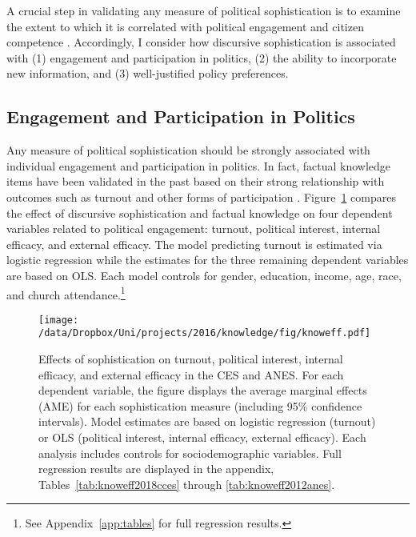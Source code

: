 A crucial step in validating any measure of political sophistication is to examine the extent to which it is correlated with political engagement and citizen competence \citep{lupia2006elitism,lupia2015uninformed}. Accordingly, I consider how discursive sophistication is associated with (1) engagement and participation in politics, (2) the ability to incorporate new information, and (3) well-justified policy preferences.


\subsection*{Engagement and Participation in Politics}
Any measure of political sophistication should be strongly associated with individual engagement and participation in politics. In fact, factual knowledge items have been validated in the past based on their strong relationship with outcomes such as turnout and other forms of participation \citep[230--233]{lupia2015uninformed}. Figure~\ref{fig:knoweff} compares the effect of discursive sophistication and factual knowledge on four dependent variables related to political engagement: turnout, political interest, internal efficacy, and external efficacy. The model predicting turnout is estimated via logistic regression while the estimates for the three remaining dependent variables are based on OLS. Each model controls for gender, education, income, age, race, and church attendance.\footnote{See Appendix~\ref{app:tables} for full regression results.}

\begin{figure}[h]\centering
\texttt{[image: /data/Dropbox/Uni/projects/2016/knowledge/fig/knoweff.pdf]}
\caption[Effects of sophistication on turnout, political interest, internal efficacy, and external efficacy]{Effects of sophistication on turnout, political interest, internal efficacy, and external efficacy in the CES and ANES. For each dependent variable, the figure displays the average marginal effects (AME) for each sophistication measure (including 95\% confidence intervals). Model estimates are based on logistic regression (turnout) or OLS (political interest, internal efficacy, external efficacy). Each analysis includes controls for sociodemographic variables. Full regression results are displayed in the appendix, Tables~\ref{tab:knoweff2018cces} through \ref{tab:knoweff2012anes}.}\label{fig:knoweff}
\end{figure}

